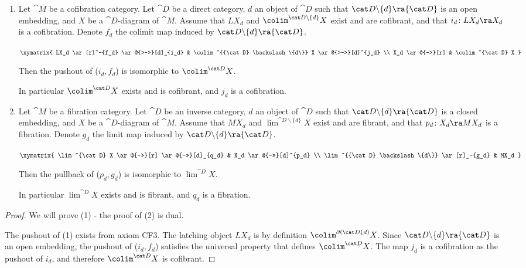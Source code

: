 \begin{lem}
\label{lem:colimpushout}
\mbox{}
\begin{enumerate}
\item
Let ${\cat M}$ be a cofibration category. Let ${\cat D}$ be a direct category, $d$ an object of ${\cat D}$ such that ${\cat D} \backslash \{d\} \ra {\cat D}$ is an open embedding, and $X$ be a ${\cat D}$-diagram of ${\cat M}$. Assume that $LX_d$ and $\colim^{{\cat D} \backslash \{d\}} X$ exist and are cofibrant, and that $i_{d} \colon LX_d \ra X_d$ is a cofibration. Denote $f_d$ the colimit map induced by ${\cat D} \backslash \{d\} \ra {\cat D}$.
\begin{center}
$ \xymatrix {
        LX_d \ar[r]^-{f_d} \ar@{>->}[d]_{i_d} & 
	\colim^{{\cat D} \backslash \{d\}} X \ar@{>-->}[d]^{j_d} \\
	X_d \ar@{-->}[r] & 
	\colim^{\cat D} X
	}$
\end{center}
Then the pushout of ($i_d, f_d$) is isomorphic to $\colim^{\cat D} X$. 

In particular $\colim^{\cat D} X$ exists and is cofibrant, and $j_d$ is a cofibration.
\item
Let ${\cat M}$ be a fibration category. Let ${\cat D}$ be an inverse category, $d$ an object of ${\cat D}$ such that ${\cat D} \backslash \{d\} \ra {\cat D}$ is a closed embedding, and $X$ be a ${\cat D}$-diagram of ${\cat M}$. Assume that $MX_d$ and $\lim^{{\cat D} \backslash \{d\}} X$ exist and are fibrant, and that $p_{d} \colon X_d \ra MX_d$ is a fibration. Denote $g_d$ the limit map induced by ${\cat D} \backslash \{d\} \ra {\cat D}$.
\begin{center}
$ \xymatrix {
	\lim^{\cat D} X \ar@{-->}[r] \ar@{-->>}[d]_{q_d} &
	X_d \ar@{->>}[d]^{p_d} \\
	\lim^{{\cat D} \backslash \{d\}} \ar[r]_-{g_d} & 
        MX_d
	}$
\end{center}
Then the pullback of ($p_d, g_d$) is isomorphic to $\lim^{\cat D} X$.

In particular $\lim^{\cat D} X$ exists and is fibrant, and $q_d$ is a fibration.
\end{enumerate}

\end{lem}

\begin{proof}
We will prove (1) - the proof of (2) is dual.

The pushout of (1) exists from axiom CF3. The latching object $LX_d$ is by definition $\colim^{\partial({\cat D} \downarrow d)}X$. Since ${\cat D} \backslash \{d\} \ra {\cat D}$ is an open embedding, the pushout of ($i_d, f_d$) satisfies the universal property that defines $\colim^{\cat D} X$. The map $j_d$ is a cofibration as the pushout of $i_d$, and therefore $\colim^{\cat D} X$ is cofibrant.
\end{proof}

